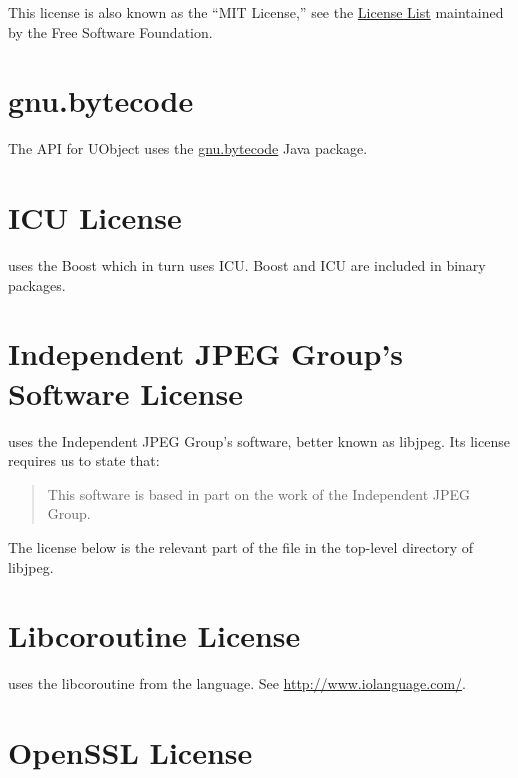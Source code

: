 This license is also known as the ``MIT License,'' see the
\href{http://www.gnu.org/licenses/license-list.html}{License List}
maintained by the Free Software Foundation.


\section{gnu.bytecode}
\label{sec:license:gnu.bytecode}
The \Java API for UObject uses the
\href{http://www.gnu.org/software/kawa/api/gnu/bytecode/package-summary.html}{gnu.bytecode}
Java package.


\section{ICU License}

\usdk uses the Boost which in turn uses ICU.  Boost and ICU are included in
binary packages.



\section{Independent JPEG Group's Software License}

\usdk uses the Independent JPEG Group's software, better known as libjpeg.
Its license requires us to state that:

\begin{quote}
  This software is based in part on the work of the Independent JPEG Group.
\end{quote}

The license below is the relevant part of the  file in the
top-level directory of libjpeg.



\section{Libcoroutine License}

\urbi uses the libcoroutine from the  language.  See
\url{http://www.iolanguage.com/}.


\section{OpenSSL License}

